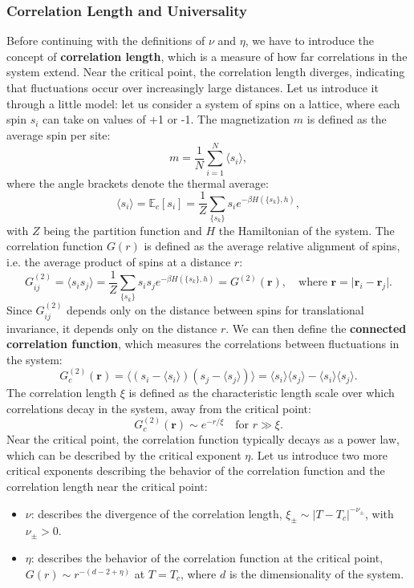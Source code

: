 \begin{itemize}
\end{itemize}

\subsubsection{Correlation Length and Universality}

Before continuing with the definitions of \(\nu\) and \(\eta\), we have to introduce the concept of \textbf{correlation length}, which is a measure of how far correlations in the system extend. Near the critical point, the correlation length diverges, indicating that fluctuations occur over increasingly large distances. Let us introduce it through a little model: let us consider a system of spins on a lattice, where each spin \(s_i\) can take on values of +1 or -1.
The magnetization \(m\) is defined as the average spin per site:
\[
    m = \frac{1}{N} \sum_{i=1}^N \langle s_i \rangle,
\]
where the angle brackets denote the thermal average:
\[
    \langle s_i \rangle = \mathbb{E}_{c}\left[ s_i \right]  = \frac{1}{Z} \sum_{\{s_k\}} s_i e^{-\beta H(\{s_k\},h)},
\]
with \(Z\) being the partition function and \(H\) the Hamiltonian of the system. The correlation function \(G(r)\) is defined as the average relative alignment of spins, i.e. the average product of spins at a distance \(r\):
\[
    G^{(2)}_{ij} = \langle s_i s_j \rangle = \frac{1}{Z} \sum_{\{s_k\}} s_i s_j e^{-\beta H(\{s_k\},h)} = G^{(2)}(\mathbf{r}), \quad \text{where } \mathbf{r} = \vert \mathbf{r}_i - \mathbf{r}_j \vert.
\]
Since \(G_{ij}^{(2)}\) depends only on the distance between spins for translational invariance, it depends only on the distance \(r\). We can then define the \textbf{connected correlation function}, which measures the correlations between fluctuations in the system:
\[
    G_c^{(2)}(\mathbf{r}) = \langle \left(s_i - \langle s_i \rangle\right) \left(s_j - \langle s_j \rangle\right) \rangle = \langle s_i \rangle \langle s_j \rangle - \langle s_i \rangle \langle s_j \rangle.
\]
The correlation length \(\xi\) is defined as the characteristic length scale over which correlations decay in the system, away from the critical point:
\[
    G_c^{(2)}(\mathbf{r}) \sim e^{- r/\xi} \quad \text{for } r \gg \xi.
\]
Near the critical point, the correlation function typically decays as a power law, which can be described by the critical exponent \(\eta\). Let us introduce two more critical exponents describing the behavior of the correlation function and the correlation length near the critical point:
\begin{itemize}
    \item $\nu$: describes the divergence of the correlation length, $\xi_{\pm} \sim |T - T_c|^{-\nu_{\pm}}$, with \(\nu_{\pm}>0\).
    \item $\eta$: describes the behavior of the correlation function at the critical point, $G(r) \sim r^{-(d-2+\eta)}$ at $T = T_c$, where $d$ is the dimensionality of the system.
\end{itemize}

